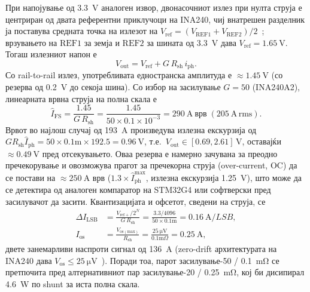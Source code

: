 \documentclass[journal,onecolumn,11pt]{IEEEtran}
\newcommand{\Rshunt}{R_{\mathrm{sh}}}
\begin{document}
При напојување од \SI{3.3}{\volt} аналоген извор, двонасочниот излез при нулта струја
е центриран од двата референтни приклучоци на INA240, чиј внатрешен разделник ја
поставува средната точка на излезот на
$V_{\mathrm{ref}}=(V_{\mathrm{REF1}}+V_{\mathrm{REF2}})/2$~\cite{ina240ds}; врзувањето
на $\mathrm{REF1}$ за земја и $\mathrm{REF2}$ за шината од \SI{3.3}{\volt} дава
$V_{\mathrm{ref}}=\SI{1.65}{\volt}$. Тогаш излезниот напон е
\begin{equation}
V_{\mathrm{out}}=V_{\mathrm{ref}}+G\,\Rshunt\,i_{\mathrm{ph}} .
\label{eq:csaout}
\end{equation}
Со rail-to-rail излез, употребливата едностранска амплитуда е $\approx\SI{1.45}{\volt}$
(со резерва од \SI{0.2}{\volt} до секоја шина). Со избор на засилување $G=50$
(INA240A2), линеарната врвна струја на полна скала е
\begin{equation}
\hat I_{\mathrm{FS}}=\frac{1.45}{G\,\Rshunt}
   =\frac{1.45}{50\times 0.1\times10^{-3}}=\SI{290}{\ampere}\ \text{врв}\;(\SI{205}{\ampere}\,\text{rms}).
\end{equation}
Врвот во најлош случај од \SI{193}{\ampere} произведува излезна екскурзија од
$G\Rshunt\hat I_{\mathrm{ph}}=50\times0.1\text{m}\times192.5=\SI{0.96}{\volt}$, т.е.\
$V_{\mathrm{out}}\in[0.69,2.61]\,\si{\volt}$, оставајќи $\approx\SI{0.49}{\volt}$ пред
отсекувањето. Оваа резерва е намерно зачувана за преодно пречекорување и овозможува
прагот за пречекорна струја (over-current, OC) да се постави на $\approx\SI{250}{\ampere}$
врв ($1.3\times\hat I_{\mathrm{ph}}^{\max}$, излезна екскурзија \SI{1.25}{\volt}), што
може да се детектира од аналоген компаратор на STM32G4 или софтверски пред засилувачот
да засити. Квантизацијата и офсетот, сведени на струја, се
\begin{align}
\Delta I_{\mathrm{LSB}} &=\frac{V_{\mathrm{ref+}}/2^{N}}{G\,\Rshunt}
   =\frac{3.3/4096}{50\times0.1\text{m}}=\SI{0.16}{\ampere/LSB},\\
I_{\mathrm{os}} &=\frac{V_{\mathrm{os(max)}}}{\Rshunt}=\frac{\SI{25}{\micro\volt}}{0.1\text{m}\Omega}
   =\SI{0.25}{\ampere},
\end{align}
двете занемарливи наспроти сигнал од \SI{136}{\ampere} (zero-drift архитектурата на
INA240 дава $V_{\mathrm{os}}\le\SI{25}{\micro\volt}$~\cite{ina240ds}). Поради тоа,
парот засилување-50 / \SI{0.1}{\milli\ohm} се претпочита пред алтернативниот пар
засилување-20 / \SI{0.25}{\milli\ohm}, кој би дисипирал \SI{4.6}{\watt} по shunt за
иста полна скала.
\end{document}
